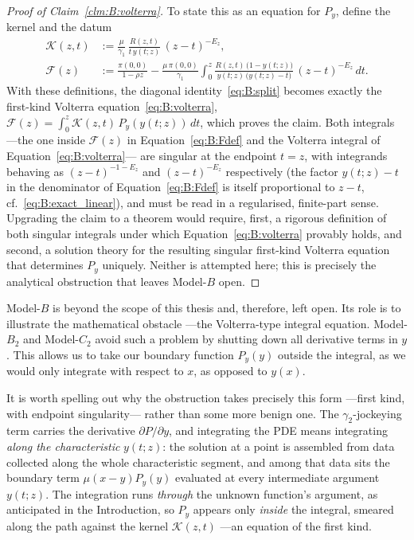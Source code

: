 \begin{proof}[Proof of Claim~\ref{clm:B:volterra}]
    To state this as an equation for $P_y$, define the kernel and the datum
    \begin{align}
        \mathcal{K}(z,t)&:=\frac{\mu}{\gamma_1}\,
            \frac{R(z,t)}{t\,y(t;z)}\,(z-t)^{-E_z},
            \label{eq:B:kernel}\\[4pt]
        \mathcal{F}(z)&:=\frac{\pi(0,0)}{1-\rho z}
            -\frac{\mu\,\pi(0,0)}{\gamma_1}\int_0^z
            \frac{R(z,t)\,\bigl(1-y(t;z)\bigr)}
                 {y(t;z)\,\bigl(y(t;z)-t\bigr)}\,(z-t)^{-E_z}\,dt.
            \label{eq:B:Fdef}
    \end{align}
    With these definitions, the diagonal identity~\eqref{eq:B:split} becomes exactly the first-kind Volterra equation~\eqref{eq:B:volterra}, $\mathcal{F}(z)=\int_0^z\mathcal{K}(z,t)\,P_y(y(t;z))\,dt$, which proves the claim. Both integrals ---the one inside $\mathcal{F}(z)$ in Equation~\eqref{eq:B:Fdef} and the Volterra integral of Equation~\eqref{eq:B:volterra}--- are singular at the endpoint $t=z$, with integrands behaving as $(z-t)^{-1-E_z}$ and $(z-t)^{-E_z}$ respectively (the factor $y(t;z)-t$ in the denominator of Equation~\eqref{eq:B:Fdef} is itself proportional to $z-t$, cf.~\eqref{eq:B:exact_linear}), and must be read in a regularised, finite-part sense. Upgrading the claim to a theorem would require, first, a rigorous definition of both singular integrals under which Equation~\eqref{eq:B:volterra} provably holds, and second, a solution theory for the resulting singular first-kind Volterra equation that determines $P_y$ uniquely. Neither is attempted here; this is precisely the analytical obstruction that leaves Model-$B$ open.
\end{proof}

Model-$B$ is beyond the scope of this thesis and, therefore, left open. Its role is to illustrate the mathematical obstacle ---the Volterra-type integral equation. Model-$B_2$ and Model-$C_2$ avoid such a problem by shutting down all derivative terms in $y$. This allows us to take our boundary function $P_y(y)$ outside the integral, as we would only integrate with respect to $x$, as opposed to $y(x)$.

It is worth spelling out why the obstruction takes precisely this form ---first kind, with endpoint singularity--- rather than some more benign one. The $\gamma_2$-jockeying term carries the derivative $\partial P/\partial y$, and integrating the PDE means integrating \emph{along the characteristic} $y(t;z)$: the solution at a point is assembled from data collected along the whole characteristic segment, and among that data sits the boundary term $\mu(x-y)P_y(y)$ evaluated at every intermediate argument $y(t;z)$. The integration runs \emph{through} the unknown function's argument, as anticipated in the Introduction, so $P_y$ appears only \emph{inside} the integral, smeared along the path against the kernel $\mathcal{K}(z,t)$ ---an equation of the first kind.


